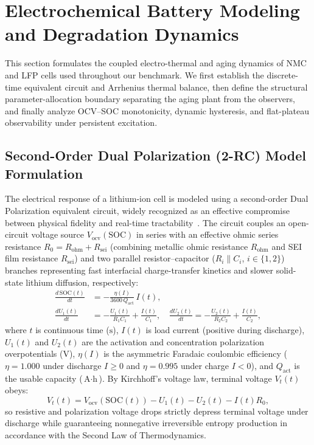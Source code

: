 \documentclass[11pt,a4paper]{article}
\begin{document}
\section{Electrochemical Battery Modeling and Degradation Dynamics}
This section formulates the coupled electro-thermal and aging dynamics of NMC and LFP cells used throughout our benchmark. We first establish the discrete-time equivalent circuit and Arrhenius thermal balance, then define the structural parameter-allocation boundary separating the aging plant from the observers, and finally analyze OCV--SOC monotonicity, dynamic hysteresis, and flat-plateau observability under persistent excitation.

\subsection{Second-Order Dual Polarization (2-RC) Model Formulation}
The electrical response of a lithium-ion cell is modeled using a second-order Dual Polarization equivalent circuit, widely recognized as an effective compromise between physical fidelity and real-time tractability~\cite{Hu2012ecm,Xiong2014}. The circuit couples an open-circuit voltage source $V_{\text{ocv}}(\text{SOC})$ in series with an effective ohmic series resistance $R_0 = R_{\text{ohm}} + R_{\text{sei}}$ (combining metallic ohmic resistance $R_{\text{ohm}}$ and SEI film resistance $R_{\text{sei}}$) and two parallel resistor--capacitor ($R_i \parallel C_i$, $i \in \{1, 2\}$) branches representing fast interfacial charge-transfer kinetics and slower solid-state lithium diffusion, respectively:
\begin{align}
\frac{d\,\text{SOC}(t)}{dt} &= -\frac{\eta(I)}{3600\,Q_{\text{act}}}\,I(t), \label{eqn:soc_diff}\\
\frac{d U_1(t)}{dt} &= -\frac{U_1(t)}{R_1 C_1} + \frac{I(t)}{C_1}, \quad \frac{d U_2(t)}{dt} = -\frac{U_2(t)}{R_2 C_2} + \frac{I(t)}{C_2}, \label{eqn:u12_diff}
\end{align}
where $t$ is continuous time ($\text{s}$), $I(t)$ is load current (positive during discharge), $U_1(t)$ and $U_2(t)$ are the activation and concentration polarization overpotentials ($\text{V}$), $\eta(I)$ is the asymmetric Faradaic coulombic efficiency ($\eta = 1.000$ under discharge $I \ge 0$ and $\eta = 0.995$ under charge $I < 0$), and $Q_{\text{act}}$ is the usable capacity ($\text{A}\cdot\text{h}$). By Kirchhoff's voltage law, terminal voltage $V_t(t)$ obeys:
\begin{equation}\label{eqn:vt_diff}
V_t(t) = V_{\text{ocv}}(\text{SOC}(t)) - U_1(t) - U_2(t) - I(t) R_0,
\end{equation}
so resistive and polarization voltage drops strictly depress terminal voltage under discharge while guaranteeing nonnegative irreversible entropy production in accordance with the Second Law of Thermodynamics.
\end{document}
